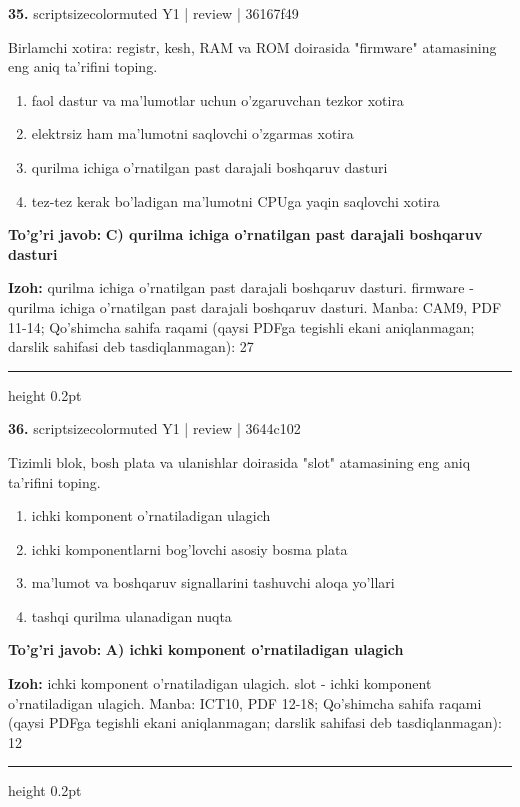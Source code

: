 \documentclass[10pt,a4paper]{article}
\begin{document}
{\bfseries\sffamily\color{ink} 35.} {scriptsizecolor{muted} Y1 | review | 36167f49}
\par
Birlamchi xotira: registr, kesh, RAM va ROM doirasida "firmware" atamasining eng aniq ta'rifini toping.
\begin{enumerate}[label=\Alph*),leftmargin=9mm]
\item faol dastur va ma'lumotlar uchun o'zgaruvchan tezkor xotira
\item elektrsiz ham ma'lumotni saqlovchi o'zgarmas xotira
\item qurilma ichiga o'rnatilgan past darajali boshqaruv dasturi
\item tez-tez kerak bo'ladigan ma'lumotni CPUga yaqin saqlovchi xotira
\end{enumerate}
\begin{tcolorbox}[enhanced,breakable,colback=teal!4,colframe=teal!60!black,boxrule=0.45pt,arc=1.2mm,left=2.7mm,right=2.7mm,top=1.8mm,bottom=1.8mm,before skip=2mm,after skip=2mm]
{\bfseries\sffamily\color{teal}To'g'ri javob:} \textbf{C) qurilma ichiga o'rnatilgan past darajali boshqaruv dasturi}
\par\smallskip
{\bfseries Izoh:} qurilma ichiga o'rnatilgan past darajali boshqaruv dasturi. firmware - qurilma ichiga o'rnatilgan past darajali boshqaruv dasturi. Manba: CAM9, PDF 11-14; Qo'shimcha sahifa raqami (qaysi PDFga tegishli ekani aniqlanmagan; darslik sahifasi deb tasdiqlanmagan): 27
\end{tcolorbox}
\vspace{2mm}\hrule height 0.2pt\vspace{3mm}

{\bfseries\sffamily\color{ink} 36.} {scriptsizecolor{muted} Y1 | review | 3644c102}
\par
Tizimli blok, bosh plata va ulanishlar doirasida "slot" atamasining eng aniq ta'rifini toping.
\begin{enumerate}[label=\Alph*),leftmargin=9mm]
\item ichki komponent o'rnatiladigan ulagich
\item ichki komponentlarni bog'lovchi asosiy bosma plata
\item ma'lumot va boshqaruv signallarini tashuvchi aloqa yo'llari
\item tashqi qurilma ulanadigan nuqta
\end{enumerate}
\begin{tcolorbox}[enhanced,breakable,colback=teal!4,colframe=teal!60!black,boxrule=0.45pt,arc=1.2mm,left=2.7mm,right=2.7mm,top=1.8mm,bottom=1.8mm,before skip=2mm,after skip=2mm]
{\bfseries\sffamily\color{teal}To'g'ri javob:} \textbf{A) ichki komponent o'rnatiladigan ulagich}
\par\smallskip
{\bfseries Izoh:} ichki komponent o'rnatiladigan ulagich. slot - ichki komponent o'rnatiladigan ulagich. Manba: ICT10, PDF 12-18; Qo'shimcha sahifa raqami (qaysi PDFga tegishli ekani aniqlanmagan; darslik sahifasi deb tasdiqlanmagan): 12
\end{tcolorbox}
\vspace{2mm}\hrule height 0.2pt\vspace{3mm}
\end{document}
